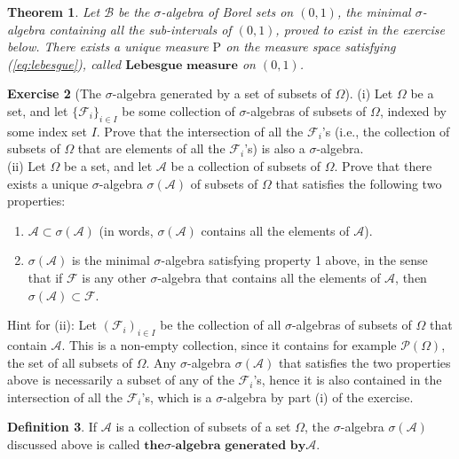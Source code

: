 \documentclass[11pt]{report}
\providecommand{\cal}{\mathcal}
\theoremstyle{plain}
\newtheorem{thm}{Theorem}[chapter]
\theoremstyle{definition}
\newtheorem{defn}[thm]{Definition}
\newtheorem{xexercise}[thm]{Exercise}
\begin{document}
\begin{thm}
\label{thm-lebesgue}
Let ${\cal B}$ be the $\sigma$-algebra of Borel sets
on $(0,1)$, the minimal $\sigma$-algebra containing
all the sub-intervals of $(0,1)$, proved to exist in
the exercise below. There exists a unique measure
$\mathrm{P}$ on the measure space satisfying
(\ref{eq:lebesgue}), called $\textbf{Lebesgue measure}$
on $(0,1)$.
\end{thm}

\begin{xexercise}[The $\sigma$-algebra generated by a set of subsets of $\Omega$]
(i) Let $\Omega$ be a set, and let
$\{{\cal F}_i\}_{i\in I}$ be some collection of
$\sigma$-algebras of subsets of $\Omega$, indexed by
some index set $I$. Prove that the intersection of
all the ${\cal F}_i$'s (i.e., the collection of
subsets of $\Omega$ that are elements of all the
${\cal F}_i$'s) is also a $\sigma$-algebra. \\ (ii)
Let $\Omega$ be a set, and let ${\cal A}$ be a
collection of subsets of $\Omega$. Prove that there
exists a unique $\sigma$-algebra $\sigma({\cal A})$
of subsets of $\Omega$ that satisfies the following
two properties:

\begin{enumerate}[label=\arabic*.]
\item ${\cal A} \subset \sigma({\cal A})$ (in words,
$\sigma({\cal A})$ contains all the elements of
${\cal A}$).

\item $\sigma({\cal A})$ is the minimal $\sigma$-algebra
satisfying property 1 above, in the sense that if
${\cal F}$ is any other $\sigma$-algebra that
contains all the elements of ${\cal A}$, then
$\sigma({\cal A}) \subset {\cal F}$.
\end{enumerate}

Hint for (ii): Let $({\cal F}_i)_{i\in I}$ be the
collection of all $\sigma$-algebras of subsets of
$\Omega$ that contain ${\cal A}$. This is a non-empty
collection, since it contains for example
${\cal P}(\Omega)$, the set of all subsets of
$\Omega$. Any $\sigma$-algebra $\sigma({\cal A})$
that satisfies the two properties above is necessarily
a subset of any of the ${\cal F}_i$'s, hence it is
also contained in the intersection of all the
${\cal F}_i$'s, which is a $\sigma$-algebra by part
(i) of the exercise.
\end{xexercise}

\begin{defn}
If ${\cal A}$ is a collection of subsets of a set
$\Omega$, the $\sigma$-algebra $\sigma({\cal A})$
discussed above is called $\textbf{the$\sigma
$-algebra generated by${\cal A}$}$.
\end{defn}
\end{document}
